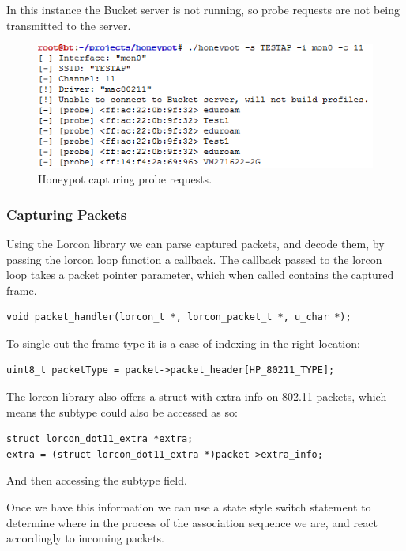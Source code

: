 In this instance the Bucket server is not running, so probe requests are not being transmitted to the server.

\begin{figure}[h!]
\centering\includegraphics[width=\linewidth]{implementation/figures/hp-running-1.png}
\caption{Honeypot capturing probe requests.}
\label{hp-1}
\end{figure}

\subsubsection{Capturing Packets}
Using the Lorcon library we can parse captured packets, and decode them, by passing the lorcon loop function a callback. The callback passed to the lorcon loop takes a packet pointer parameter, which when called contains the captured frame. 

\begin{verbatim}
void packet_handler(lorcon_t *, lorcon_packet_t *, u_char *);
\end{verbatim}

To single out the frame type it is a case of indexing in the right location:

\begin{verbatim}
uint8_t packetType = packet->packet_header[HP_80211_TYPE];
\end{verbatim}

The lorcon library also offers a struct with extra info on 802.11 packets, which means the subtype could also be accessed as so:

\begin{verbatim}
struct lorcon_dot11_extra *extra;
extra = (struct lorcon_dot11_extra *)packet->extra_info;
\end{verbatim}

And then accessing the subtype field.

Once we have this information we can use a state style switch statement to determine where in the process of the association sequence we are, and react accordingly to incoming packets.

